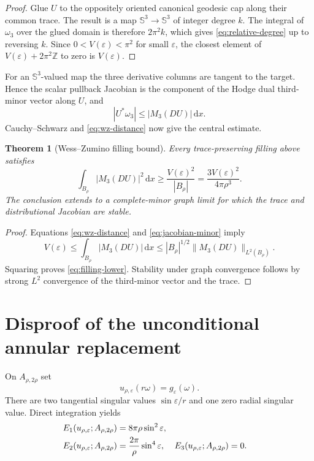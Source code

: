 \documentclass[11pt]{article}
\newtheorem{theorem}{Theorem}[section]
\newcommand{\dd}{\,\mathrm d}
\newcommand{\SSS}{\mathbb S}
\begin{document}
\begin{proof}
Glue $U$ to the oppositely oriented canonical geodesic cap along their common
trace.  The result is a map $\SSS^3\to\SSS^3$ of integer degree $k$.  The
integral of $\omega_3$ over the glued domain is therefore $2\pi^2k$, which
gives \eqref{eq:relative-degree} up to reversing $k$.  Since
$0<V(\varepsilon)<\pi^2$ for small $\varepsilon$, the closest element of
$V(\varepsilon)+2\pi^2\mathbb Z$ to zero is $V(\varepsilon)$.
\end{proof}

For an $\SSS^3$-valued map the three derivative columns are tangent to the
target.  Hence the scalar pullback Jacobian is the component of the Hodge
dual third-minor vector along $U$, and
\begin{equation}
 |U^*\omega_3|\leq |M_3(DU)|\dd x.
 \label{eq:jacobian-minor}
\end{equation}
Cauchy--Schwarz and \eqref{eq:wz-distance} now give the central estimate.

\begin{theorem}[Wess--Zumino filling bound]
Every trace-preserving filling above satisfies
\begin{equation}
 \boxed{\int_{B_\rho}|M_3(DU)|^2\dd x
 \geq\frac{V(\varepsilon)^2}{|B_\rho|}
 =\frac{3V(\varepsilon)^2}{4\pi\rho^3}.}
 \label{eq:filling-lower}
\end{equation}
The conclusion extends to a complete-minor graph limit for which the trace
and distributional Jacobian are stable.
\end{theorem}

\begin{proof}
Equations \eqref{eq:wz-distance} and \eqref{eq:jacobian-minor} imply
\[
 V(\varepsilon)
 \leq\int_{B_\rho}|M_3(DU)|\dd x
 \leq |B_\rho|^{1/2}
       \|M_3(DU)\|_{L^2(B_\rho)}.
\]
Squaring proves \eqref{eq:filling-lower}.  Stability under graph convergence
follows by strong $L^2$ convergence of the third-minor vector and the trace.
\end{proof}

\section{Disproof of the unconditional annular replacement}

On $A_{\rho,2\rho}$ set
\begin{equation}
 u_{\rho,\varepsilon}(r\omega)=g_\varepsilon(\omega).
 \label{eq:radial-constant}
\end{equation}
There are two tangential singular values $\sin\varepsilon/r$ and one zero
radial singular value.  Direct integration yields
\begin{align}
 E_1(u_{\rho,\varepsilon};A_{\rho,2\rho})
 &=8\pi\rho\sin^2\varepsilon,\notag\\
 E_2(u_{\rho,\varepsilon};A_{\rho,2\rho})
 &=\frac{2\pi}{\rho}\sin^4\varepsilon,
 &E_3(u_{\rho,\varepsilon};A_{\rho,2\rho})&=0.
 \label{eq:shell-exact}
\end{align}
\end{document}

